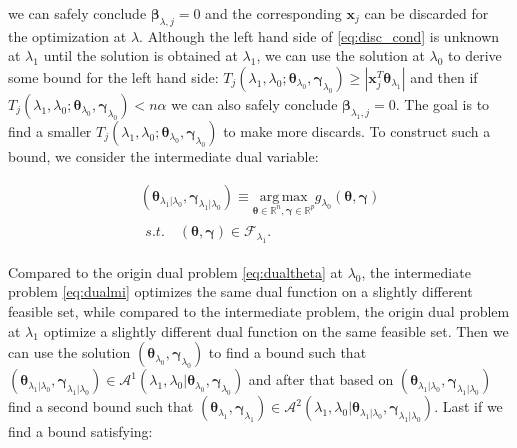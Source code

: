 we can safely conclude $\boldsymbol\beta_{\lambda,j}=0$ and the corresponding $\boldsymbol x_j$ can be discarded for the optimization at $\lambda$. Although the left hand side of \eqref{eq:disc_cond} is unknown at $\lambda_1$ until the solution is obtained at $\lambda_1$, we can use the solution at $\lambda_{0}$ to derive some bound for the left hand side: $T_j(\lambda_{1},\lambda_{0};\boldsymbol\theta_{\lambda_0},\boldsymbol\gamma_{\lambda_0})\geq |\boldsymbol x_j^T\boldsymbol\theta_{\lambda_1}|$ and then if $T_j(\lambda_{1},\lambda_{0};\boldsymbol\theta_{\lambda_0},\boldsymbol\gamma_{\lambda_0})<n\alpha$ we can also safely conclude $\boldsymbol\beta_{\lambda_1,j}=0$. The goal is to find a smaller $T_j(\lambda_{1},\lambda_{0};\boldsymbol\theta_{\lambda_0},\boldsymbol\gamma_{\lambda_0})$ to make more discards. To construct such a bound, we consider the intermediate dual variable:

\begin{gather}
        \label{eq:dualmi}
        (\boldsymbol\theta_{\lambda_1|\lambda_0},\boldsymbol\gamma_{\lambda_1|\lambda_0})\equiv\underset{\boldsymbol\theta\in \mathbb{R}^{ n},\boldsymbol\gamma\in\mathbb{R}^p}{\mathrm{arg\,max}}g_{\lambda_0}(\boldsymbol\theta,\boldsymbol\gamma)\\
        \begin{aligned}s.t.\quad (\boldsymbol\theta,\boldsymbol\gamma)\in \mathcal{F}_{\lambda_1}\nonumber.
        \end{aligned}
\end{gather}

Compared to the origin dual problem \eqref{eq:dualtheta} at $\lambda_0$, the intermediate problem \eqref{eq:dualmi} optimizes the same dual function on a slightly different feasible set, while compared to the intermediate problem, the origin dual problem at $\lambda_1$ optimize a slightly different dual function on the same feasible set. Then we can use the solution $(\boldsymbol\theta_{\lambda_0},\boldsymbol\gamma_{\lambda_0})$ to find a bound such that $(\boldsymbol\theta_{\lambda_1|\lambda_0},\boldsymbol\gamma_{\lambda_1|\lambda_0})\in \mathcal{A}^1(\lambda_1,\lambda_0|\boldsymbol\theta_{\lambda_0},\boldsymbol\gamma_{\lambda_0})$ and after that based on $(\boldsymbol\theta_{\lambda_1|\lambda_0},\boldsymbol\gamma_{\lambda_1|\lambda_0})$ find a second bound such that $(\boldsymbol\theta_{\lambda_1},\boldsymbol\gamma_{\lambda_1})\in \mathcal{A}^2(\lambda_1,\lambda_0|\boldsymbol\theta_{\lambda_1|\lambda_0},\boldsymbol\gamma_{\lambda_1|\lambda_0})$. Last if we find a bound satisfying:

